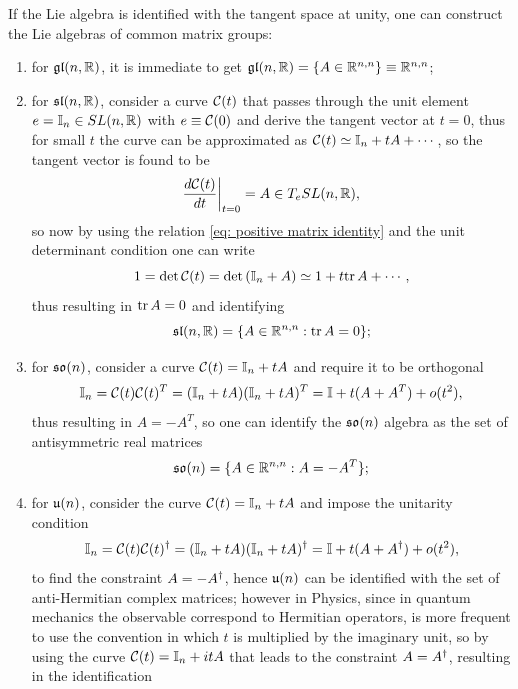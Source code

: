 \begin{ex}
    If the Lie algebra is identified with the tangent space at unity, one can construct the Lie algebras of common matrix groups:
    \begin{enumerate}
        \item for $\mathfrak{gl}(n,\mathbb{R})$, it is immediate to get $\mathfrak{gl}(n,\mathbb{R}) = \{A \in \mathbb{R}^{n,n}\} \equiv \mathbb{R}^{n,n}$;
        \item for $\mathfrak{sl}(n,\mathbb{R})$, consider a curve $\mathcal{C}(t)$ that passes through the unit element $e = \mathbb{I}_n \in SL(n,\mathbb{R})$ with $e \equiv \mathcal{C}(0)$ and derive the tangent vector at $t = 0$, thus for small $t$ the curve can be approximated as $\mathcal{C}(t) \simeq \mathbb{I}_n + tA + \cdots$, so the tangent vector is found to be
        \begin{equation}
            \frac{d\mathcal{C}(t)}{dt}\bigg|_{t = 0} = A \in T_eSL(n,\mathbb{R}),
        \end{equation}
        so now by using the relation \eqref{eq: positive matrix identity} and the unit determinant condition one can write
        \begin{equation}
            1 = \det{\mathcal{C}(t)} = \det{(\mathbb{I}_n + A)} \simeq 1 + t\mathrm{tr}\,{A} + \cdots,
        \end{equation}
        thus resulting in $\mathrm{tr}\,{A} = 0$ and identifying 
        \begin{equation}
            \mathfrak{sl}(n,\mathbb{R}) = \{A \in \mathbb{R}^{n,n} : \mathrm{tr}\,{A} = 0\};
        \end{equation}
        \item for $\mathfrak{so}(n)$, consider a curve $\mathcal{C}(t) = \mathbb{I}_n + tA$ and require it to be orthogonal 
        \begin{equation}
            \mathbb{I}_n = \mathcal{C}(t)\mathcal{C}(t)^T = (\mathbb{I}_n + tA)(\mathbb{I}_n + tA)^T = \mathbb{I} + t(A + A^T) + o(t^2),
        \end{equation}
        thus resulting in $A = -A^T$, so one can identify the $\mathfrak{so}(n)$ algebra as the set of antisymmetric real matrices
        \begin{equation}
            \mathfrak{so}(n) = \{A \in \mathbb{R}^{n,n} : A = -A^T\};
        \end{equation}
        \item for $\mathfrak{u}(n)$, consider the curve $\mathcal{C}(t) = \mathbb{I}_n + tA$ and impose the unitarity condition
        \begin{equation}
            \mathbb{I}_n = \mathcal{C}(t)\mathcal{C}(t)^\dagger = (\mathbb{I}_n + tA)(\mathbb{I}_n + tA)^\dagger = \mathbb{I} + t(A + A^\dagger) + o(t^2),
        \end{equation}
        to find the constraint $A = -A^\dagger$, hence $\mathfrak{u}(n)$ can be identified with the set of anti-Hermitian complex matrices; however in Physics, since in quantum mechanics the observable correspond to Hermitian operators, is more frequent to use the convention in which $t$ is multiplied by the imaginary unit, so by using the curve $\mathcal{C}(t) = \mathbb{I}_n + itA$ that leads to the constraint $A = A^\dagger$, resulting in the identification

\end{enumerate}
\end{ex}
